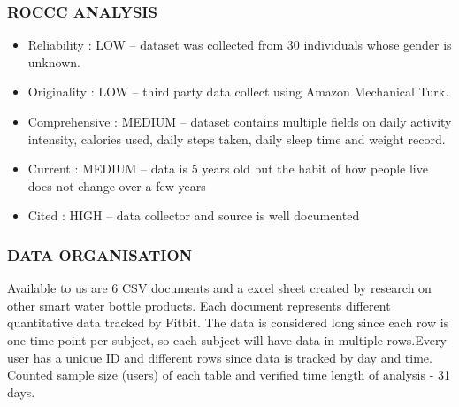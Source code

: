 \documentclass[
]{article}
\providecommand{\tightlist}{%
  \setlength{\itemsep}{0pt}\setlength{\parskip}{0pt}}
\begin{document}
\hypertarget{roccc-analysis}{%
\subsubsection{ROCCC ANALYSIS}\label{roccc-analysis}}

\begin{itemize}
\tightlist
\item
  Reliability : LOW -- dataset was collected from 30 individuals whose
  gender is unknown.
\item
  Originality : LOW -- third party data collect using Amazon Mechanical
  Turk.
\item
  Comprehensive : MEDIUM -- dataset contains multiple fields on daily
  activity intensity, calories used, daily steps taken, daily sleep time
  and weight record.
\item
  Current : MEDIUM -- data is 5 years old but the habit of how people
  live does not change over a few years
\item
  Cited : HIGH -- data collector and source is well documented
\end{itemize}

\hypertarget{data-organisation}{%
\subsubsection{DATA ORGANISATION}\label{data-organisation}}

Available to us are 6 CSV documents and a excel sheet created by
research on other smart water bottle products. Each document represents
different quantitative data tracked by Fitbit. The data is considered
long since each row is one time point per subject, so each subject will
have data in multiple rows.Every user has a unique ID and different rows
since data is tracked by day and time. Counted sample size (users) of
each table and verified time length of analysis - 31 days.
\end{document}
